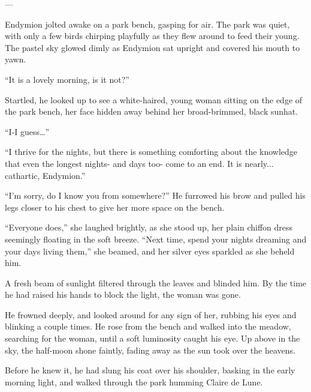 ---

Endymion jolted awake on a park bench, gasping for air. The park was quiet, with only a few birds chirping playfully as they flew around to feed their young. The pastel sky glowed dimly as Endymion sat upright and covered his mouth to yawn.

“It is a lovely morning, is it not?”

Startled, he looked up to see a white-haired, young woman sitting on the edge of the park bench, her face hidden away behind her broad-brimmed, black sunhat.

“I-I guess…”

“I thrive for the nights, but there is something comforting about the knowledge that even the longest nights- and days too- come to an end. It is nearly... cathartic, Endymion.”

“I’m sorry, do I know you from somewhere?” He furrowed his brow and pulled his legs closer to his chest to give her more space on the bench.

“Everyone does,” she laughed brightly, as she stood up, her plain chiffon dress seemingly floating in the soft breeze. “Next time, spend your nights dreaming and your days living them,” she beamed, and her silver eyes sparkled as she beheld him.

A fresh beam of sunlight filtered through the leaves and blinded him. By the time he had raised his hands to block the light, the woman was gone.

He frowned deeply, and looked around for any sign of her, rubbing his eyes and blinking a couple times. He rose from the bench and walked into the meadow, searching for the woman, until a soft luminosity caught his eye. Up above in the sky, the half-moon shone faintly, fading away as the sun took over the heavens.

Before he knew it, he had slung his coat over his shoulder, basking in the early morning light, and walked through the park humming Claire de Lune.
%
